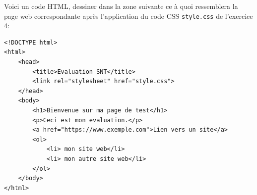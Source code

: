 \documentclass[11pt, a4paper, tikz,border=10pt]{report}
\def\ptsexoE{5}
\begin{document}
        \bigskip

       

    \pagebreak

\exods{\ptsexoE}

Voici un code HTML, dessiner dans la zone suivante ce à quoi ressemblera la page web correspondante après l'application du code CSS \verb|style.css| de l'exercice 4:

\begin{lstlisting}[numbers=none]
<!DOCTYPE html>
<html>
    <head>
        <title>Evaluation SNT</title>
        <link rel="stylesheet" href="style.css">
    </head>
    <body>
        <h1>Bienvenue sur ma page de test</h1>
        <p>Ceci est mon evaluation.</p>
        <a href="https://www.exemple.com">Lien vers un site</a>
        <ol>
            <li> mon site web</li>
            <li> mon autre site web</li>
        </ol>
    </body>
</html>
    \end{lstlisting}
\end{document}
